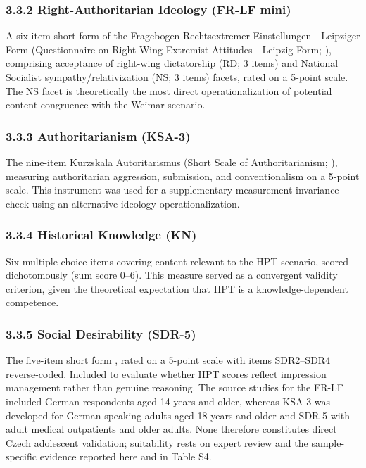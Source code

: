 \documentclass[PCJ,Unicode,screen,mode=plain]{cedram}
\begin{document}
\subsubsection*{3.3.2 Right-Authoritarian Ideology (FR-LF mini)}\label{right-authoritarian-ideology-fr-lf-mini}

A six-item short form of the Fragebogen Rechtsextremer Einstellungen---Leipziger Form (Questionnaire on Right-Wing Extremist Attitudes---Leipzig Form; \citealp{Decker_et_al2013Rechtsextremismus}), comprising acceptance of right-wing dictatorship (RD; 3 items) and National Socialist sympathy/relativization (NS; 3 items) facets, rated on a 5-point scale. The NS facet is theoretically the most direct operationalization of potential content congruence with the Weimar scenario.

\subsubsection*{3.3.3 Authoritarianism (KSA-3)}\label{authoritarianism-ksa-3}

The nine-item Kurzskala Autoritarismus (Short Scale of
Authoritarianism; \citealp{Beierlein_et_al2014Die_Kurzskala}), measuring authoritarian
aggression, submission, and conventionalism on a 5-point scale. This instrument was used for a supplementary measurement invariance check using an alternative ideology operationalization.

\subsubsection*{3.3.4 Historical Knowledge (KN)}\label{historical-knowledge-kn}

Six multiple-choice items covering content relevant to the HPT scenario, scored dichotomously (sum score 0--6). This measure served as a convergent validity criterion, given the theoretical expectation that HPT is a knowledge-dependent competence.

\subsubsection*{3.3.5 Social Desirability (SDR-5)}\label{social-desirability-sdr-5}

The five-item short form \citep{Hays_et_al1989A_Five}, rated on a 5-point scale with items SDR2--SDR4 reverse-coded. Included to evaluate whether HPT scores reflect impression management rather than genuine reasoning. The source studies for the FR-LF included German respondents aged 14 years and older, whereas KSA-3 was developed for German-speaking adults aged 18 years and older and SDR-5 with adult medical outpatients and older adults. None therefore constitutes direct Czech adolescent validation; suitability rests on expert review and the sample-specific evidence reported here and in Table S4.
\end{document}

